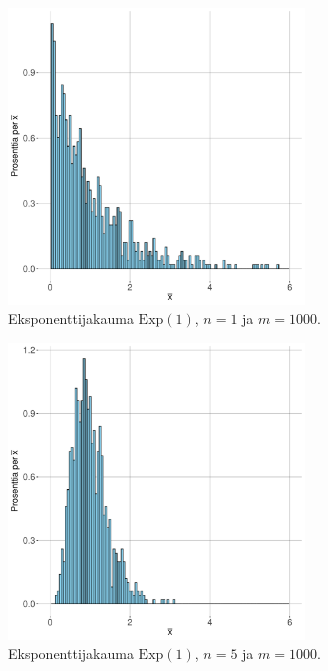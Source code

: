 \documentclass{beamer}
\begin{document}
\begin{frame}
  \begin{center}
    \begin{figure}
      \includegraphics[width=0.7\textwidth, height=0.7\textwidth]{exp-n-1.pdf}
      \caption{Eksponenttijakauma $\mathrm{Exp}\left(1\right)$, $n = 1$ ja $m = 1000$.}
  \end{figure}
\end{center}
\end{frame}


\begin{frame}
  \begin{center}
    \begin{figure}
      \includegraphics[width=0.7\textwidth, height=0.7\textwidth]{exp-n-5.pdf}
      \caption{Eksponenttijakauma $\mathrm{Exp}\left(1\right)$, $n = 5$ ja $m = 1000$.}
  \end{figure}
\end{center}
\end{frame}
\end{document}
